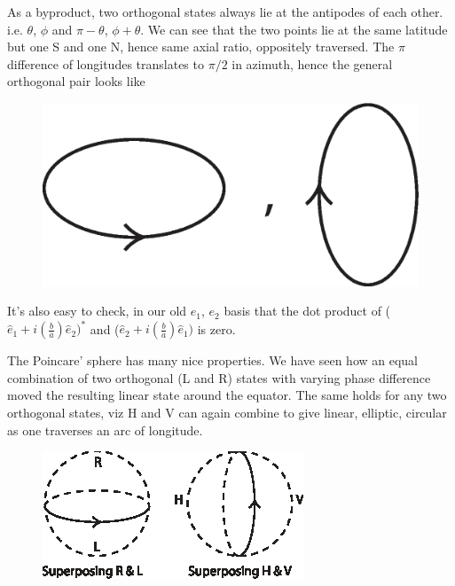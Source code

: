 As a byproduct, two orthogonal states always lie at the antipodes of each
other. i.e. $\theta$, $\phi$ and $\pi - \theta$, $\phi + \theta$. We can see that the two points lie at the
same latitude but one S and one N, hence same axial ratio, oppositely traversed.
The $\pi$ difference of longitudes translates to $\pi/2$ in azimuth, hence the general
orthogonal pair looks like
\medskip

\begin{figure}[H]
\centering
\includegraphics[scale=0.25]{src/images/chap26/8.jpg}
\end{figure}
\bigskip

It's also easy to check, in our old $e_1$, $e_2$ basis that the dot product of ($\hat{e}_1 + i (\frac{b}{a}) \hat{e}_2)^{\ast}$ and ($\hat{e}_2 + i(\frac{b}{a}) \hat{e}_1)$ is zero.

The Poincare' sphere has many nice properties. We have seen how an equal
combination of two orthogonal (L and R) states with varying phase difference
moved the resulting linear state around the equator. The same holds for any
two orthogonal states, viz H and V can again combine to give linear, elliptic,
circular as one traverses an arc of longitude.
\bigskip

\begin{figure}[H]
\centering
\includegraphics[scale=1.2]{src/images/chap26/9.jpg}
\end{figure}
\bigskip

